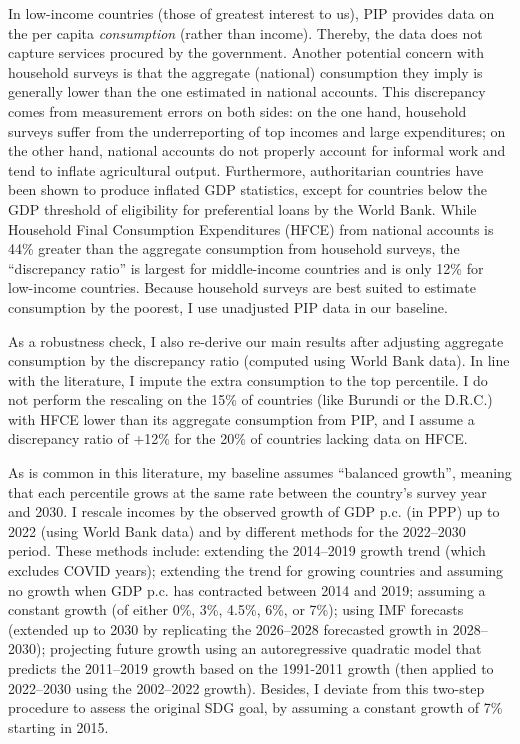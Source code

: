 In low-income countries (those of greatest interest to us), PIP provides data on the per capita \textit{consumption} (rather than income). Thereby, the data does not capture services procured by the government. Another potential concern with household surveys is that the aggregate (national) consumption they imply is generally lower than the one estimated in national accounts.\cite{deaton_measuring_2005,prydz_disparities_2022} This discrepancy comes from measurement errors on both sides: on the one hand, household surveys suffer from the underreporting of top incomes and large expenditures; on the other hand, national accounts do not properly account for informal work %
and tend to inflate agricultural output.\cite{angrist_why_2021} 
Furthermore, authoritarian countries have been shown to produce inflated GDP statistics, except for countries below the GDP threshold of eligibility for preferential loans by the World Bank.\cite{martinez_how_2022} %
While Household Final Consumption Expenditures (HFCE) from national accounts is 44\% greater than the aggregate consumption from household surveys, the ``discrepancy ratio'' is largest for middle-income countries and is only 12\% for low-income countries. 
Because household surveys are best suited to estimate consumption by the poorest, I use unadjusted PIP data in our baseline. 

As a robustness check, I also re-derive our main results after adjusting aggregate consumption by the discrepancy ratio (computed using World Bank data). In line with the literature,\cite{lakner_global_2013,anand_chapter_2015} I impute the extra consumption to the top percentile. I do not perform the rescaling on the 15\% of countries (like Burundi or the D.R.C.) with HFCE lower than its aggregate consumption from PIP, and I assume a discrepancy ratio of +12\% for the 20\% of countries lacking data on HFCE. 

As is common in this literature,\cite{karver_mdgs_2012,hellebrandt_future_2015,bicaba_can_2017} my baseline assumes ``balanced growth'', meaning that each percentile grows at the same rate between the country's survey year and 2030. 
I rescale incomes by the observed growth of GDP p.c. (in PPP) up to 2022 (using World Bank data) and by different methods for the 2022--2030 period. 
These methods include: extending the 2014--2019 growth trend (which excludes COVID years); extending the trend for growing countries and assuming no growth when GDP p.c. has contracted between 2014 and 2019; assuming a constant growth (of either 0\%, 3\%, 4.5\%, 6\%, or 7\%); using IMF forecasts\cite{imf_world_2023} (extended up to 2030 by replicating the 2026--2028 forecasted growth in 2028--2030); projecting future growth using an autoregressive quadratic model that predicts the 2011--2019 growth based on the 1991-2011 growth (then applied to 2022--2030 using the 2002--2022 growth). Besides, I deviate from this two-step procedure to assess the original SDG goal, by assuming a constant growth of 7\% starting in 2015.



